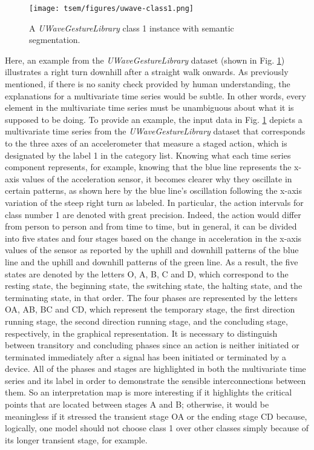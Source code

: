 \documentclass{svproc}
\begin{document}
\begin{figure}[h!]
\centering
\texttt{[image: tsem/figures/uwave-class1.png]}
\caption{A \textit{UWaveGestureLibrary} class 1 instance with semantic segmentation.}
\label{fig:uwave}
\end{figure}
Here, an example from the \textit{UWaveGestureLibrary} dataset (shown in Fig. \ref{fig:uwave}) illustrates a right turn downhill after a straight walk onwards. As previously mentioned, if there is no sanity check provided by human understanding, the explanations for a multivariate time series would be subtle. In other words, every element in the multivariate time series must be unambiguous about what it is supposed to be doing. To provide an example, the input data in Fig. \ref{fig:uwave} depicts a multivariate time series from the \textit{UWaveGestureLibrary} dataset that corresponds to the three axes of an accelerometer that measure a staged action, which is designated by the label 1 in the category list. Knowing what each time series component represents, for example, knowing that the blue line represents the x-axis values of the acceleration sensor, it becomes clearer why they oscillate in certain patterns, as shown here by the blue line's oscillation following the x-axis variation of the steep right turn as labeled. In particular, the action intervals for class number 1 are denoted with great precision. Indeed, the action would differ from person to person and from time to time, but in general, it can be divided into five states and four stages based on the change in acceleration in the x-axis values of the sensor as reported by the uphill and downhill patterns of the blue line and the uphill and downhill patterns of the green line. As a result, the five states are denoted by the letters O, A, B, C and D, which correspond to the resting state, the beginning state, the switching state, the halting state, and the terminating state, in that order. The four phases are represented by the letters OA, AB, BC and CD, which represent the temporary stage, the first direction running stage, the second direction running stage, and the concluding stage, respectively, in the graphical representation. It is necessary to distinguish between transitory and concluding phases since an action is neither initiated or terminated immediately after a signal has been initiated or terminated by a device. All of the phases and stages are highlighted in both the multivariate time series and its label in order to demonstrate the sensible interconnections between them. So an interpretation map is more interesting if it highlights the critical points that are located between stages A and B; otherwise, it would be meaningless if it stressed the transient stage OA or the ending stage CD because, logically, one model should not choose class 1 over other classes simply because of its longer transient stage, for example.
\end{document}
